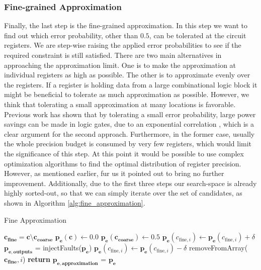\documentclass[conference]{IEEEtran}
\begin{document}
\subsubsection{Fine-grained Approximation}
Finally, the last step is the fine-grained approximation. In this step we want to find out which error probability, other than $0.5$, can be tolerated at the circuit registers. We are step-wise raising the applied error probabilities to see if the required constraint is still satisfied. There are two main alternatives in approaching the approximation limit. One is to make the approximation at individual registers as high as possible. The other is to approximate evenly over the registers. If a register is holding data from a large combinational logic block it might be beneficial to tolerate as much approximation as possible. However, we think that tolerating a small approximation at many locations is favorable. Previous work has shown that by tolerating a small error probability, large power savings can be made in logic gates, due to an exponential correlation \cite{korkmaz2006advocating}, which is a clear argument for the second approach. Furthermore, in the former case, usually the whole precision budget is consumed by very few registers, which would limit the significance of this step. At this point it would be possible to use complex optimization algorithms to find the optimal distribution of register precision. However, as mentioned earlier, fur us it pointed out to bring no further improvement. Additionally, due to the first three steps our search-space is already highly sorted-out, so that we can simply iterate over the set of candidates, as shown in Algorithm \ref{alg:fine_approximation}. 
\begin{algorithm}
  \caption{Fine Approximation}\label{alg:fine_approximation}
  \begin{algorithmic}[1]
    \State $\mathbf{c_{fine}} = \mathbf{c} \setminus \mathbf{c_{coarse}}$
    \State $\mathbf{p_e}(\mathbf{c}) \gets 0.0$
    \State $\mathbf{p_e}(\mathbf{c_{coarse}}) \gets 0.5$
    \State $\mathbf{p_e}(c_{\textrm{fine},i}) \gets \mathbf{p_e}(c_{\textrm{fine},i}) + \delta$
    \State $\mathbf{p_{e,outputs}}$ = injectFaults($\mathbf{p_e}$)
    \State $\mathbf{p_e}(c_{\textrm{fine},i}) \gets \mathbf{p_e}(c_{\textrm{fine},i}) - \delta$
    \State removeFromArray($\mathbf{c_{fine}},i$)
    \EndIf
    \EndFor
    \EndWhile
    \State \textbf{return} $\mathbf{p_{e,approximation}}$ = $\mathbf{p_e}$
    \EndProcedure
  \end{algorithmic}
\end{algorithm}
\end{document}
